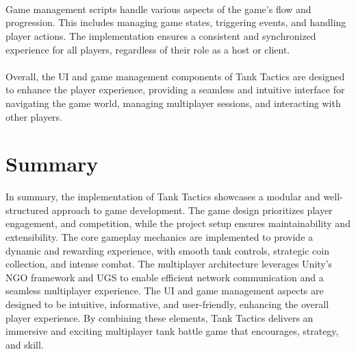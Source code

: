 \\
\\
\\
Game management scripts handle various aspects of the game's flow and progression. This includes managing game states, triggering events, and handling player actions. The implementation ensures a consistent and synchronized experience for all players, regardless of their role as a host or client.
\\
\noindent
\\
Overall, the UI and game management components of Tank Tactics are designed to enhance the player experience, providing a seamless and intuitive interface for navigating the game world, managing multiplayer sessions, and interacting with other players.


\section{Summary}
In summary, the implementation of Tank Tactics showcases a modular and well-structured approach to game development. The game design prioritizes player engagement, and competition, while the project setup ensures maintainability and extensibility. The core gameplay mechanics are implemented to provide a dynamic and rewarding experience, with smooth tank controls, strategic coin collection, and intense combat. The multiplayer architecture leverages Unity's NGO framework and UGS to enable efficient network communication and a seamless multiplayer experience. The UI and game management aspects are designed to be intuitive, informative, and user-friendly, enhancing the overall player experience. By combining these elements, Tank Tactics delivers an immersive and exciting multiplayer tank battle game that encourages, strategy, and skill.

